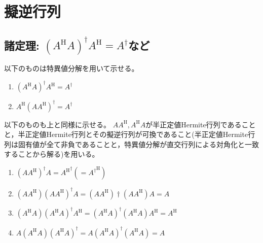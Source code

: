 \chapter{擬逆行列}
    \section{諸定理: \texorpdfstring{$(A^\mathrm{H}A)^\dagger A^\mathrm{H} = A^\dagger$}{(A\string^H A)\string^† A\string^H = A\string^†}など}
        以下のものは特異値分解を用いて示せる。
        \begin{enumerate}
            \item $(A^\mathrm{H}A)^\dagger A^\mathrm{H} = A^\dagger$
            \item $A^\mathrm{H}(AA^\mathrm{H})^\dagger = A^\dagger$
        \end{enumerate}
        以下のものも上と同様に示せる。
        $AA^\mathrm{H},A^\mathrm{H}A$が半正定値Hermite行列であることと，半正定値Hermite行列とその擬逆行列が可換であること(半正定値Hermite行列は固有値が全て非負であることと，特異値分解が直交行列による対角化と一致することから解る)を用いる。
        \begin{enumerate}
            \item $(AA^\mathrm{H})^\dagger A = {A^\mathrm{H}}^\dagger (= {A^\dagger}^\mathrm{H})$
            \item $(AA^\mathrm{H})(AA^\mathrm{H})^\dagger A = (AA^\mathrm{H})\dagger(AA^\mathrm{H})A = A$
            \item $(A^\mathrm{H}A)(A^\mathrm{H}A)^\dagger A^\mathrm{H} = (A^\mathrm{H}A)^\dagger(A^\mathrm{H}A)A^\mathrm{H} = A^\mathrm{H}$
            \item $A(A^\mathrm{H}A)(A^\mathrm{H}A)^\dagger = A(A^\mathrm{H}A)^\dagger(A^\mathrm{H}A) = A$
        \end{enumerate}
